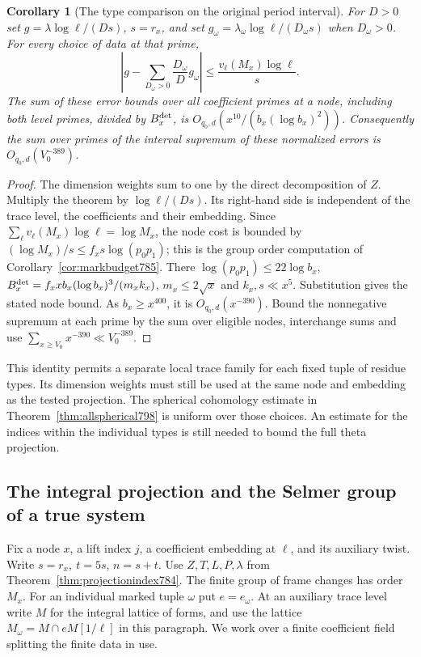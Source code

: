 \documentclass[a4paper,11pt]{article}
\newtheorem{corollary}[proposition]{Corollary}
\theoremstyle{definition}
\theoremstyle{remark}
\numberwithin{equation}{section}
\begin{document}
\begin{corollary}[The type comparison on the original period interval]
\leavevmode\label{cor:typedbudget799}
For \(D>0\) set \(g=\lambda\log\ell/(D s)\), \(s=r_x\),
and set \(g_\omega=\lambda_\omega\log\ell/(D_\omega s)\)
when \(D_\omega>0\). For every choice of data at that
prime,
\[
       \left|g-\sum_{D_\omega>0}
                     \frac{D_\omega}{D}g_\omega\right|
                       \le\frac{v_\ell(M_x)\log\ell}{s}.
\]
The sum of these error bounds over all coefficient primes
at a node, including both level primes, divided by
\(B_x^{\rm det}\), is
\(O_{q_0,d}(x^{10}/(b_x(\log b_x)^2))\).
Consequently the sum over primes of the interval supremum
of these normalized errors is \(O_{q_0,d}(V_0^{-389})\).
\end{corollary}
\begin{proof}
The dimension weights sum to one by the direct decomposition
of \(Z\). Multiply the theorem by \(\log\ell/(Ds)\).
Its right-hand side is independent of the trace level, the
coefficients and their embedding. Since
\(\sum_\ell v_\ell(M_x)\log\ell=\log M_x\), the node cost
is bounded by \((\log M_x)/s\le f_xs\log(p_0p_1)\);
this is the group order computation of
Corollary~\ref{cor:markbudget785}. There
\(\log(p_0p_1)\le22\log b_x\),
\(B_x^{\rm det}=f_x x b_x(\log b_x)^3/(m_x k_x)\),
\(m_x\le2\sqrt{x}\) and \(k_x,s\ll x^5\). Substitution
gives the stated node bound. As \(b_x\ge x^{400}\),
it is \(O_{q_0,d}(x^{-390})\). Bound the nonnegative
supremum at each prime by the sum over eligible nodes,
interchange sums and use \(\sum_{x\ge V_0}x^{-390}
\ll V_0^{-389}\).
\end{proof}
This identity permits a separate local trace family for
each fixed tuple of residue types. Its dimension weights
must still be used at the same node and embedding as the
tested projection. The spherical cohomology estimate in
Theorem~\ref{thm:allspherical798} is uniform over those
choices. An estimate for the indices within the individual
types is still needed to bound the full theta projection.
\clearpage

\subsection{The integral projection and the Selmer group of a true system}
\label{sec:markeddescent802}
Fix a node \(x\), a lift index \(j\), a coefficient embedding at
\(\ell\), and its auxiliary twist. Write \(s=r_x,\ t=5s\),
\(n=s+t\). Use \(Z,T,L,P,\lambda\) from
Theorem~\ref{thm:projectionindex784}. The finite group of frame
changes has order \(M_x\). For an individual marked tuple
\(\omega\) put \(e=e_\omega\). At an auxiliary trace level
write \(M\) for the integral lattice of forms, and use the lattice
\(M_\omega=M\cap eM[1/\ell]\) in this paragraph. We work over
a finite coefficient field splitting the finite data in use.
\end{document}
